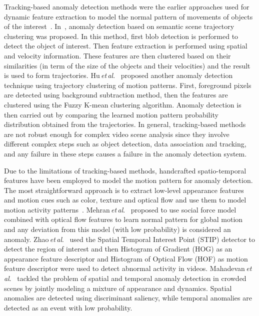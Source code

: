 \documentclass[journal]{IEEEtran}
\newcommand{\authorcite}{{\textit{et}\,\textit{al}.}}
\begin{document}
Tracking-based anomaly detection methods were the earlier approaches used for dynamic feature extraction to model the normal pattern of movements of objects of the interest~\cite{piciarelli2008trajectory,cai2015trajectory}. In~\cite{wang2006learning}, anomaly detection based on semantic scene trajectory clustering was proposed. In this method, first blob detection is performed to detect the object of interest. Then feature extraction is performed using spatial and velocity information. These features are then clustered based on their similarities (in term of the size of the objects and their velocities) and the result is used to form trajectories. Hu\,\authorcite~\cite{hu2006system} proposed another anomaly detection technique using trajectory clustering of motion patterns. First, foreground pixels are detected using background subtraction method, then the features are clustered using the Fuzzy K-mean clustering algorithm. Anomaly detection is then carried out by comparing the learned motion pattern probability distribution obtained from the trajectories. In general, tracking-based methods are not robust enough for complex video scene analysis since they involve different complex steps such as object detection, data association and tracking, and any failure in these steps causes a failure in the anomaly detection system.

Due to the limitations of tracking-based methods, handcrafted spatio-temporal features have been employed to model the motion pattern for anomaly detection. The most straightforward approach is to extract low-level appearance features and motion cues such as color, texture and optical flow and use them to model motion activity patterns~\cite{cong2011sparse,lu2013abnormal,kratz2009anomaly,adam2008robust,mehran2009abnormal}. Mehran\,\authorcite~\cite{mehran2009abnormal} proposed to use social force model combined with optical flow features to learn normal pattern for global motion and any deviation from this model (with low probability) is considered an anomaly. Zhao\,\authorcite~\cite{zhao2015abnormal} used the Spatial Temporal Interest Point (STIP) detector to detect the region of interest and then Histogram of Gradient (HOG) as an appearance feature descriptor and Histogram of Optical Flow (HOF) as motion feature descriptor were used to detect abnormal activity in videos. Mahadevan\,\authorcite~\cite{mahadevan2010anomaly} tackled the problem of spatial and temporal anomaly detection in crowded scenes by jointly modeling a mixture of appearance and dynamics. Spatial anomalies are detected using discriminant saliency, while temporal anomalies are detected as an event with low probability.
\end{document}
